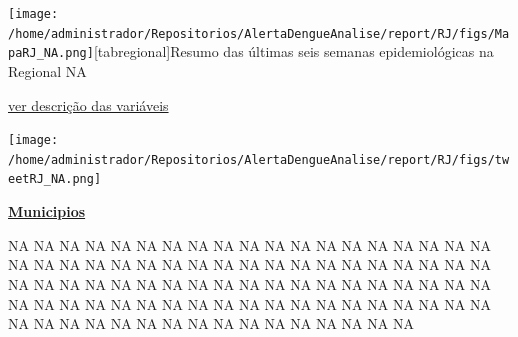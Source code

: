 \documentclass[10pt]{article} %
\begin{document}

\begin{minipage}[t]{.66\linewidth}\hypertarget{MtrI}{}\texttt{[image: /home/administrador/Repositorios/AlertaDengueAnalise/report/RJ/figs/MapaRJ\_NA.png]}[tabregional]{Resumo das últimas seis semanas epidemiológicas na Regional NA }\begin{center}\end{center}\small{\hyperlink{vartab}{ver descrição das variáveis}}\begin{center}\texttt{[image: /home/administrador/Repositorios/AlertaDengueAnalise/report/RJ/figs/tweetRJ\_NA.png]}\end{center}\end{minipage}\hfill\begin{minipage}[t]{.30\linewidth}\begin{mdframed}[style=sidebar,frametitle={}]\textbf{\hyperlink{municips}{Municipios}}\begin{itemize}\wsquare NA 
\wsquare NA 
\wsquare NA 
\wsquare NA 
\wsquare NA 
\wsquare NA 
\wsquare NA 
\wsquare NA 
\wsquare NA 
\wsquare NA 
\wsquare NA 
\wsquare NA 
\wsquare NA 
\wsquare NA 
\wsquare NA 
\wsquare NA 
\wsquare NA 
\wsquare NA 
\wsquare NA 
\wsquare NA 
\wsquare NA 
\wsquare NA 
\wsquare NA 
\wsquare NA 
\wsquare NA 
\wsquare NA 
\wsquare NA 
\wsquare NA 
\wsquare NA 
\wsquare NA 
\wsquare NA 
\wsquare NA 
\wsquare NA 
\wsquare NA 
\wsquare NA 
\wsquare NA 
\wsquare NA 
\wsquare NA 
\wsquare NA 
\wsquare NA 
\wsquare NA 
\wsquare NA 
\wsquare NA 
\wsquare NA 
\wsquare NA 
\wsquare NA 
\wsquare NA 
\wsquare NA 
\wsquare NA 
\wsquare NA 
\wsquare NA 
\wsquare NA 
\wsquare NA 
\wsquare NA 
\wsquare NA 
\wsquare NA 
\wsquare NA 
\wsquare NA 
\wsquare NA 
\wsquare NA 
\wsquare NA 
\wsquare NA 
\wsquare NA 
\wsquare NA 
\wsquare NA 
\wsquare NA 
\wsquare NA 
\wsquare NA 
\wsquare NA 
\wsquare NA 
\wsquare NA 
\wsquare NA 
\wsquare NA 
\wsquare NA 
\wsquare NA 
\wsquare NA 
\wsquare NA 
\wsquare NA 
\wsquare NA 
\wsquare NA 
\wsquare NA 
\wsquare NA 
\wsquare NA 
\wsquare NA 
\wsquare NA 
\wsquare NA 
\wsquare NA 
\wsquare NA 
\wsquare NA 
\wsquare NA 
\wsquare NA 
\wsquare NA \end{itemize}\BackToContents\end{mdframed}\hfill\end{minipage}\newpage
\end{document}
